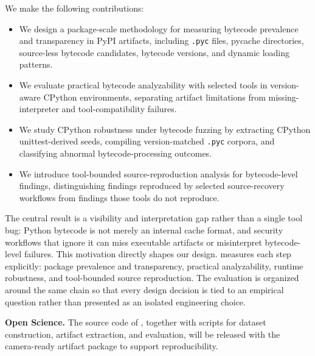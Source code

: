 We make the following contributions:
\begin{itemize}[leftmargin=1.25em]
  \item We design a package-scale methodology for measuring bytecode prevalence and transparency in PyPI artifacts, including \texttt{.pyc} files, pycache directories, source-less bytecode candidates, bytecode versions, and dynamic loading patterns.
  \item We evaluate practical bytecode analyzability with selected tools in version-aware CPython environments, separating artifact limitations from missing-interpreter and tool-compatibility failures.
  \item We study CPython robustness under bytecode fuzzing by extracting CPython unittest-derived seeds, compiling version-matched \texttt{.pyc} corpora, and classifying abnormal bytecode-processing outcomes.
  \item We introduce tool-bounded source-reproduction analysis for bytecode-level findings, distinguishing findings reproduced by selected source-recovery workflows from findings those tools do not reproduce.
\end{itemize}

The central result is a visibility and interpretation gap rather than a single tool bug: Python bytecode is not merely an internal cache format, and security workflows that ignore it can miss executable artifacts or misinterpret bytecode-level failures.  This motivation directly shapes our design.  {\tech} measures each step explicitly: package prevalence and transparency, practical analyzability, runtime robustness, and tool-bounded source reproduction.  The evaluation is organized around the same chain so that every design decision is tied to an empirical question rather than presented as an isolated engineering choice.

\noindent
\textbf{Open Science.}
The source code of {\tech}, together with scripts for dataset construction, artifact extraction, and evaluation, will be released with the camera-ready artifact package to support reproducibility.
